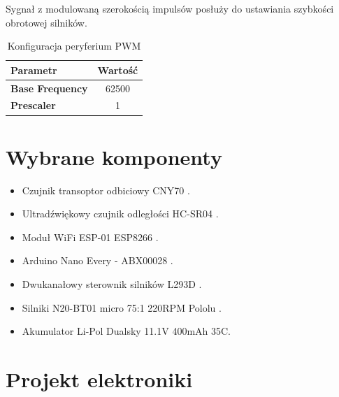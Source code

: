 \documentclass[10pt, a4paper]{article}
\begin{document}
Sygnał z modulowaną szerokością impulsów posłuży do ustawiania szybkości obrotowej silników.

\begin{table}[H]
	\centering
	\begin{tabular}{|l|c|} \hline
		\textbf{Parametr} & Wartość \\
		\hline
		\hline  \textbf{Base Frequency}&62500  \\\hline
		\textbf{Prescaler} &  1\\\hline
		
	\end{tabular}
	\caption{Konfiguracja peryferium PWM}
	\label{tab:USART}
\end{table}


\section{Wybrane komponenty}
\begin{itemize}
    \item Czujnik transoptor odbiciowy CNY70 \cite{dok4}.
    \item Ultradźwiękowy czujnik odległości HC-SR04 \cite{dok3}.
    \item Moduł WiFi ESP-01 ESP8266 \cite{dok2}.
    \item Arduino Nano Every - ABX00028 \cite{dok1}.
    \item Dwukanałowy sterownik silników L293D \cite{dok5}.
    \item Silniki N20-BT01 micro 75:1 220RPM Pololu \cite{dok6}.
    \item Akumulator Li-Pol Dualsky 11.1V 400mAh 35C.
\end{itemize}



\section{Projekt elektroniki}
\end{document}
